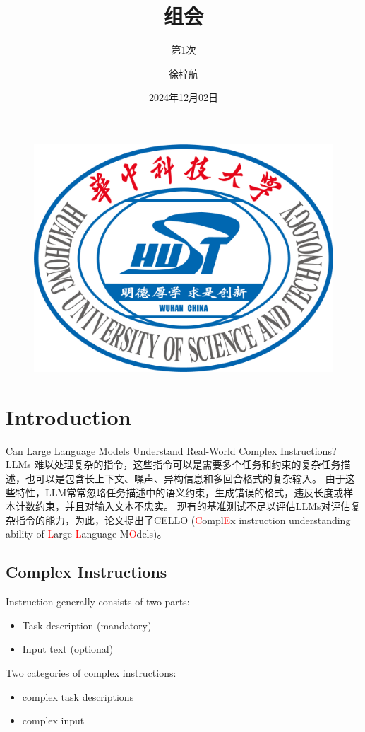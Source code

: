 \documentclass{beamer}
\author{徐梓航}
\title{组会}
\subtitle{第1次}
\institute{华中科技大学计算机科学与技术学院}
\date{2024年12月02日}
\begin{document}

\begin{frame}
    \titlepage
    \begin{figure}[htpb]
        \begin{center}
            \includegraphics[width=0.2\linewidth]{images/templates/HUST_LOGO.png}
        \end{center}
    \end{figure}
\end{frame}

\begin{frame}
    \tableofcontents[sectionstyle=show,subsectionstyle=show/shaded/hide,subsubsectionstyle=show/shaded/hide]
\end{frame}

\section{Introduction}

\begin{frame}{Can Large Language Models Understand Real-World Complex Instructions?}
    LLMs 难以处理复杂的指令，这些指令可以是需要多个任务和约束的复杂任务描述，也可以是包含长上下文、噪声、异构信息和多回合格式的复杂输入。
    \newline
    \newline
    由于这些特性，LLM常常忽略任务描述中的语义约束，生成错误的格式，违反长度或样本计数约束，并且对输入文本不忠实。
    \newline
    \newline
    现有的基准测试不足以评估LLMs对评估复杂指令的能力，为此，论文提出了CELLO (\textcolor{red}{C}ompl\textcolor{red}{E}x instruction understanding ability of \textcolor{red}{L}arge \textcolor{red}{L}anguage M\textcolor{red}{O}dels)。
\end{frame}

\subsection{Complex Instructions}

\begin{frame}
    Instruction generally consists of two parts:
    \begin{itemize}
        \item {Task description (mandatory)}
        \item {Input text (optional)}
    \end{itemize}

    Two categories of complex instructions:
    \begin{itemize}
        \item {complex task descriptions}
        \item {complex input}
    \end{itemize}
\end{frame}
\end{document}
